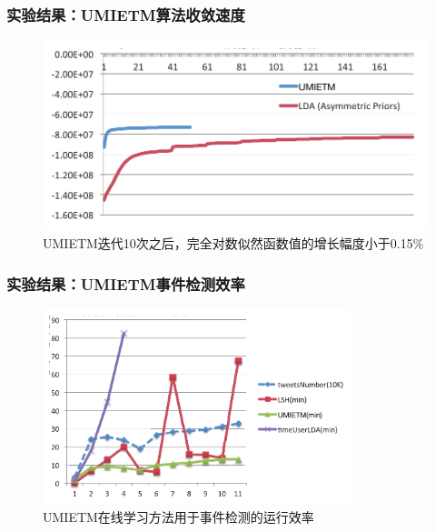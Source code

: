 \begin{frame}
\frametitle{\noindent 实验结果：UMIETM算法收敛速度}
\begin{figure}
	\caption{UMIETM迭代10次之后，完全对数似然函数值的增长幅度小于0.15\%}
    \includegraphics[width=1.0\textwidth]{img/UMIETM/completeLoglikelihood.pdf}
\end{figure}

\end{frame}


\begin{frame}
\frametitle{\noindent 实验结果：UMIETM事件检测效率}
\begin{figure}
	\caption{UMIETM在线学习方法用于事件检测的运行效率}
    \includegraphics[width=0.8\textwidth]{img/UMIETM/efficiencyCompareWithLSH.pdf}
\end{figure}
\end{frame}

